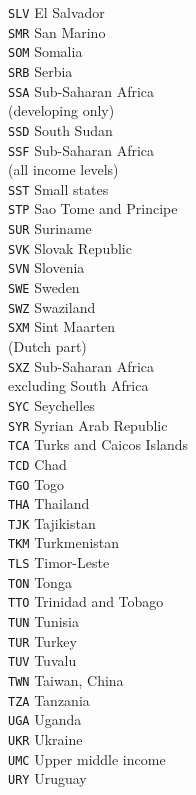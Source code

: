 \begin{multicols}{3}
{\texttt{SLV}	El Salvador\\
\texttt{SMR}	San Marino\\
\texttt{SOM}	Somalia\\
\texttt{SRB}	Serbia\\
\texttt{SSA}	Sub-Saharan Africa\\
(developing only)\\
\texttt{SSD}	South Sudan\\
\texttt{SSF}	Sub-Saharan Africa\\
(all income levels)\\
\texttt{SST}	Small states\\
\texttt{STP}	Sao Tome and Principe\\
\texttt{SUR}	Suriname\\
\texttt{SVK}	Slovak Republic\\
\texttt{SVN}	Slovenia\\
\texttt{SWE}	Sweden\\
\texttt{SWZ}	Swaziland\\
\texttt{SXM}	Sint Maarten\\
(Dutch part)\\
\texttt{SXZ}	Sub-Saharan Africa \\
excluding South Africa\\
\texttt{SYC}	Seychelles\\
\texttt{SYR}	Syrian Arab Republic\\
\texttt{TCA}	Turks and Caicos Islands\\
\texttt{TCD}	Chad\\
\texttt{TGO}	Togo\\
\texttt{THA}	Thailand\\
\texttt{TJK}	Tajikistan\\
\texttt{TKM}	Turkmenistan\\
\texttt{TLS}	Timor-Leste\\
\texttt{TON}	Tonga\\
\texttt{TTO}	Trinidad and Tobago\\
\texttt{TUN}	Tunisia\\
\texttt{TUR}	Turkey\\
\texttt{TUV}	Tuvalu\\
\texttt{TWN}	Taiwan, China\\
\texttt{TZA}	Tanzania\\
\texttt{UGA}	Uganda\\
\texttt{UKR}	Ukraine\\
\texttt{UMC}	Upper middle income\\
\texttt{URY}	Uruguay\\
}
\end{multicols}
